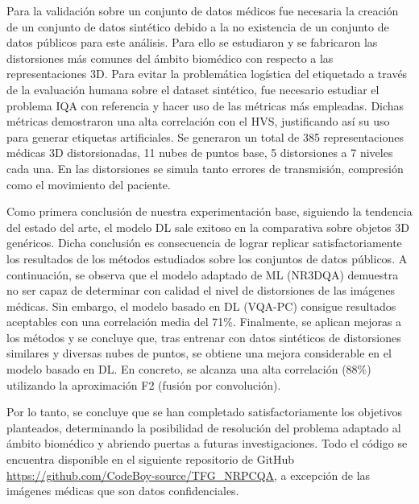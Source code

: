 Para la validación sobre un conjunto de datos médicos fue necesaria la creación 
de un conjunto de datos sintético debido a la no existencia de un conjunto de 
datos públicos para este análisis. Para ello se estudiaron y se fabricaron las distorsiones más 
comunes del ámbito biomédico con respecto a las representaciones 3D. 
Para evitar la problemática logística del etiquetado a través de la 
evaluación humana sobre el dataset sintético, 
fue necesario estudiar el problema IQA con referencia y hacer uso de las métricas 
más empleadas. Dichas métricas demostraron una alta correlación con el HVS, 
justificando así su uso para generar etiquetas artificiales.
Se generaron un total de 385 representaciones médicas 3D distorsionadas, 11 nubes de puntos 
base, 5 distorsiones a 7 niveles cada una. En las distorsiones se simula 
tanto errores de transmisión, compresión como el movimiento del paciente.

Como primera conclusión de nuestra experimentación base, 
siguiendo la tendencia del estado del arte, el modelo DL sale exitoso en la 
comparativa sobre objetos 3D genéricos. Dicha conclusión es consecuencia 
de lograr replicar satisfactoriamente los resultados de los métodos estudiados 
sobre los conjuntos de datos públicos.
A continuación, se observa que el modelo adaptado de ML (NR3DQA) demuestra no 
ser capaz de determinar con calidad el nivel de distorsiones de las imágenes médicas. 
Sin embargo, el modelo basado en DL (VQA-PC) consigue resultados aceptables con 
una correlación media del 71\%.
Finalmente, se aplican mejoras a los métodos 
y se concluye que, tras entrenar con datos sintéticos de distorsiones similares y 
diversas nubes de puntos, se obtiene una mejora considerable en el modelo basado en DL. 
En concreto, se alcanza una alta correlación (88\%) utilizando la aproximación F2 
(fusión por convolución).

Por lo tanto, se concluye que se han completado satisfactoriamente los objetivos 
planteados, determinando la posibilidad de resolución del problema adaptado 
al ámbito biomédico y abriendo puertas a futuras investigaciones. 
Todo el código se encuentra disponible en el siguiente repositorio de 
GitHub \url{https://github.com/CodeBoy-source/TFG_NRPCQA},
a excepción de las imágenes médicas que son datos confidenciales.

